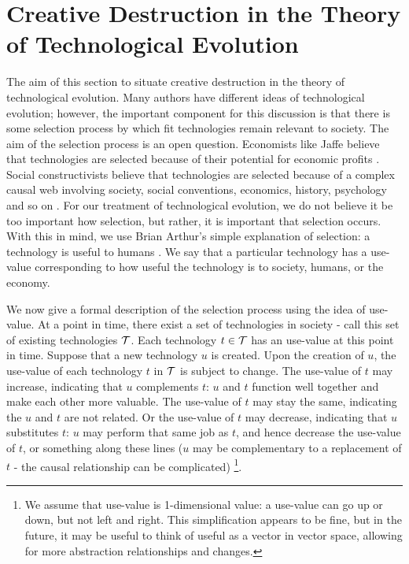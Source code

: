\documentclass[11pt]{article}
\begin{document}
\section{Creative Destruction in the Theory of Technological Evolution}
The aim of this section to situate creative destruction in the theory of technological evolution.
Many authors have different ideas of technological evolution; however, the important component for this discussion is that there is some selection process by which fit technologies remain relevant to society.
The aim of the selection process is an open question.
Economists like Jaffe believe that technologies are selected because of their potential for economic profits \cite{jaffe}.
Social constructivists believe that technologies are selected because of a complex causal web involving society, social conventions, economics, history, psychology and so on \cite{scot}.
For our treatment of technological evolution, we do not believe it be too important how selection, but rather, it is important that selection occurs. 
With this in mind, we use Brian Arthur's simple explanation of selection: a technology is useful to humans \cite{arthur}.
We say that a particular technology has a use-value corresponding to how useful the technology is to society, humans, or the economy. 

We now give a formal description of the selection process using the idea of use-value. 
At a point in time, there exist a set of technologies in society - call this set of existing technologies $\mathcal{T}$. 
Each technology $t \in \mathcal{T}$ has an use-value at this point in time. 
Suppose that a new technology $u$ is created.
Upon the creation of $u$, the use-value of each technology $t$ in $\mathcal{T}$ is subject to change.
The use-value of $t$ may increase, indicating that $u$ complements $t$: $u$ and $t$ function well together and make each other more valuable.
The use-value of $t$ may stay the same, indicating the $u$ and $t$ are not related.
Or the use-value of $t$ may decrease, indicating that $u$ substitutes $t$: $u$ may perform that same job as $t$, and hence decrease the use-value of $t$, or something along these lines ($u$ may be complementary to a replacement of $t$ - the causal relationship can be complicated)
\footnote{We assume that use-value is 1-dimensional value: a use-value can go up or down, but not left and right. 
This simplification appears to be fine, but in the future, it may be useful to think of useful as a vector in vector space, allowing for more abstraction relationships and changes.}.
\end{document}
